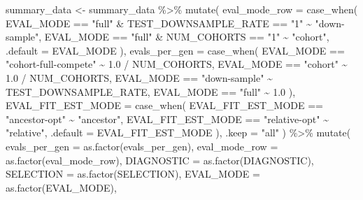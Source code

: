 \documentclass[
]{book}
\newenvironment{Shaded}{\begin{snugshade}}{\end{snugshade}}
\newcommand{\AttributeTok}[1]{\textcolor[rgb]{0.77,0.63,0.00}{#1}}
\newcommand{\FloatTok}[1]{\textcolor[rgb]{0.00,0.00,0.81}{#1}}
\newcommand{\FunctionTok}[1]{\textcolor[rgb]{0.00,0.00,0.00}{#1}}
\newcommand{\NormalTok}[1]{#1}
\newcommand{\OtherTok}[1]{\textcolor[rgb]{0.56,0.35,0.01}{#1}}
\newcommand{\SpecialCharTok}[1]{\textcolor[rgb]{0.00,0.00,0.00}{#1}}
\newcommand{\StringTok}[1]{\textcolor[rgb]{0.31,0.60,0.02}{#1}}
\begin{document}
\begin{Shaded}
\begin{Highlighting}[]
\NormalTok{summary\_data }\OtherTok{\textless{}{-}}\NormalTok{ summary\_data }\SpecialCharTok{\%\textgreater{}\%}
  \FunctionTok{mutate}\NormalTok{(}
    \AttributeTok{eval\_mode\_row =} \FunctionTok{case\_when}\NormalTok{(}
\NormalTok{      EVAL\_MODE }\SpecialCharTok{==} \StringTok{"full"} \SpecialCharTok{\&}\NormalTok{ TEST\_DOWNSAMPLE\_RATE }\SpecialCharTok{==} \StringTok{"1"} \SpecialCharTok{\textasciitilde{}} \StringTok{"down{-}sample"}\NormalTok{,}
\NormalTok{      EVAL\_MODE }\SpecialCharTok{==} \StringTok{"full"} \SpecialCharTok{\&}\NormalTok{ NUM\_COHORTS }\SpecialCharTok{==} \StringTok{"1"} \SpecialCharTok{\textasciitilde{}} \StringTok{"cohort"}\NormalTok{,}
      \AttributeTok{.default =}\NormalTok{ EVAL\_MODE}
\NormalTok{    ),}
    \AttributeTok{evals\_per\_gen =} \FunctionTok{case\_when}\NormalTok{(}
\NormalTok{      EVAL\_MODE }\SpecialCharTok{==} \StringTok{"cohort{-}full{-}compete"} \SpecialCharTok{\textasciitilde{}} \FloatTok{1.0} \SpecialCharTok{/}\NormalTok{ NUM\_COHORTS,}
\NormalTok{      EVAL\_MODE }\SpecialCharTok{==} \StringTok{"cohort"} \SpecialCharTok{\textasciitilde{}} \FloatTok{1.0} \SpecialCharTok{/}\NormalTok{ NUM\_COHORTS,}
\NormalTok{      EVAL\_MODE }\SpecialCharTok{==} \StringTok{"down{-}sample"} \SpecialCharTok{\textasciitilde{}}\NormalTok{ TEST\_DOWNSAMPLE\_RATE,}
\NormalTok{      EVAL\_MODE }\SpecialCharTok{==} \StringTok{"full"} \SpecialCharTok{\textasciitilde{}} \FloatTok{1.0}
\NormalTok{    ),}
    \AttributeTok{EVAL\_FIT\_EST\_MODE =} \FunctionTok{case\_when}\NormalTok{(}
\NormalTok{      EVAL\_FIT\_EST\_MODE }\SpecialCharTok{==} \StringTok{"ancestor{-}opt"} \SpecialCharTok{\textasciitilde{}} \StringTok{"ancestor"}\NormalTok{,}
\NormalTok{      EVAL\_FIT\_EST\_MODE }\SpecialCharTok{==} \StringTok{"relative{-}opt"} \SpecialCharTok{\textasciitilde{}} \StringTok{"relative"}\NormalTok{,}
      \AttributeTok{.default =}\NormalTok{ EVAL\_FIT\_EST\_MODE}
\NormalTok{    ),}
    \AttributeTok{.keep =} \StringTok{"all"}
\NormalTok{  ) }\SpecialCharTok{\%\textgreater{}\%}
  \FunctionTok{mutate}\NormalTok{(}
    \AttributeTok{evals\_per\_gen =} \FunctionTok{as.factor}\NormalTok{(evals\_per\_gen),}
    \AttributeTok{eval\_mode\_row =} \FunctionTok{as.factor}\NormalTok{(eval\_mode\_row),}
    \AttributeTok{DIAGNOSTIC =} \FunctionTok{as.factor}\NormalTok{(DIAGNOSTIC),}
    \AttributeTok{SELECTION =} \FunctionTok{as.factor}\NormalTok{(SELECTION),}
    \AttributeTok{EVAL\_MODE =} \FunctionTok{as.factor}\NormalTok{(EVAL\_MODE),}

\end{Highlighting}
\end{Shaded}
\end{document}
